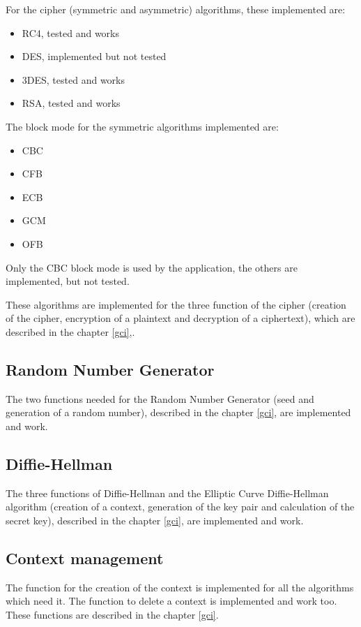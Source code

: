 For the cipher (symmetric and asymmetric) algorithms, these implemented are:
\begin{itemize}[noitemsep]
  \item RC4, tested and works
  \item DES, implemented but not tested
  \item 3DES, tested and works
  \item RSA, tested and works
\end{itemize}

The block mode for the symmetric algorithms implemented are:
\begin{itemize}[noitemsep]
  \item CBC
  \item CFB
  \item ECB
  \item GCM
  \item OFB
\end{itemize}
Only the CBC block mode is used by the \embtls application, the others are
implemented, but not tested.

These algorithms are implemented for the three function of the cipher (creation
of the cipher, encryption of a plaintext and decryption of a ciphertext),
which are described in the chapter \ref{gci},.

\subsection*{Random Number Generator}
The two functions needed for the Random Number Generator (seed and generation of
a random number), described in the chapter \ref{gci}, are implemented and work.

\subsection*{Diffie-Hellman}

The three functions of Diffie-Hellman and the Elliptic Curve Diffie-Hellman
algorithm (creation of a context, generation of the key pair and calculation of
the secret key), described in the chapter \ref{gci}, are implemented and work.

\subsection*{Context management}
The function for the creation of the context is implemented for all the
algorithms which need it.
The function to delete a context is implemented and work too.
These functions are described in the chapter \ref{gci}.

